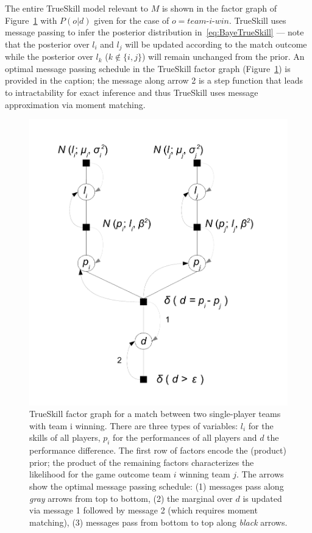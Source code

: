 The entire TrueSkill model relevant to $M$ is shown in the
factor graph of Figure~\ref{fig:trueskill} with $P(o|d)$ given
for the case of $o = \textit{team-i-win}$.
TrueSkill uses message passing %
to infer the posterior distribution in~\eqref{eq:BayeTrueSkill} ---
note that the posterior over $l_i$ and $l_j$ will be
updated according to the match
outcome while the posterior over
$l_k$ ($k \notin \{ i,j \}$) will remain unchanged from
the prior.  An optimal message passing schedule in the TrueSkill
factor graph (Figure~\ref{fig:trueskill}) is provided in the caption;
the message along arrow 2 is a step function that leads to
intractability for exact inference and thus TrueSkill uses message
approximation via moment matching.

\begin{figure}[t!]
\centerline{\includegraphics[scale=0.35]{TrueSkill}}
\caption{\small TrueSkill factor graph for a match between two single-player
teams with team i winning.
There are three types of variables: $l_i$
for the skills of all players, $p_i$ for the performances of all
players and $d$ the performance difference. The first row of factors
encode the (product) prior; the product of the remaining factors
characterizes the likelihood for the game outcome team $i$ winning team $j$.
The arrows show the optimal message passing schedule: (1)
messages pass along \emph{gray} arrows from top to bottom, (2) the
marginal over $d$ is updated via message 1 followed by message 2
(which requires moment matching), (3) messages pass from bottom to top
along \emph{black} arrows.}
\label{fig:trueskill}
\vspace{-3mm}
\end{figure}

